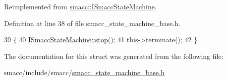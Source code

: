 Reimplemented from \hyperlink{classsmacc_1_1ISmaccStateMachine_adcb1b55e014f982a713a863ffb0261d3}{smacc\+::\+I\+Smacc\+State\+Machine}.



Definition at line 38 of file smacc\+\_\+state\+\_\+machine\+\_\+base.\+h.


\begin{DoxyCode}
39     \{
40         \hyperlink{classsmacc_1_1ISmaccStateMachine_adcb1b55e014f982a713a863ffb0261d3}{ISmaccStateMachine::stop}();
41         this->terminate();
42     \}
\end{DoxyCode}


The documentation for this struct was generated from the following file\+:\begin{DoxyCompactItemize}
\item 
smacc/include/smacc/\hyperlink{smacc__state__machine__base_8h}{smacc\+\_\+state\+\_\+machine\+\_\+base.\+h}\end{DoxyCompactItemize}
